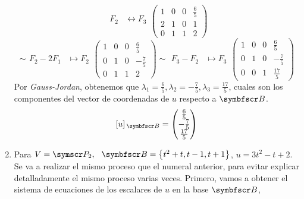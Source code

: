 \begin{enumerate}[label=\listAlph]
\[\begin{aligned}
                    F_2 &\leftrightarrow F_3 \\
                \end{aligned}
                \left(
                \begin{array}{ccc|c}
                    1 & 0 & 0 & \frac{6}{5} \\
                    2 & 1 & 0 & 1 \\
                    0 & 1 & 1 & 2
                \end{array}
                \right)
            \]
            \[
                \sim
                \begin{aligned}
                    F_2 - 2F_1 &\mapsto F_2
                \end{aligned}
                \left(
                \begin{array}{ccc|c}
                    1 & 0 & 0 & \frac{6}{5} \\
                    0 & 1 & 0 & -\frac{7}{5} \\
                    0 & 1 & 1 & 2
                \end{array}
                \right)
                \sim
                \begin{aligned}
                    F_3 - F_2 &\mapsto F_3 
                \end{aligned}
                \left(
                \begin{array}{ccc|c}
                    1 & 0 & 0 & \frac{6}{5} \\
                    0 & 1 & 0 & -\frac{7}{5} \\
                    0 & 0 & 1 & \frac{17}{5}
                \end{array}
                \right)
            \]
            Por \emph{Gauss-Jordan}, obtenemos que \(\lambda_1 = \frac{6}{5}, \lambda_2 = -\frac{7}{5}, \lambda_3 = \frac{17}{5}\), 
            cuales son los componentes del vector de coordenadas de \(u\) respecto a \(\fb\).
            \[
                \veccoord{u}{\fb} = \fvec{\frac{6}{5},-\frac{7}{5},\frac{17}{5}}
            \]
        \item Para \(V = \fp_2, \hspace{0.25cm} \fb = \fset{t^2 + t, t - 1, t + 1}\), \(u = 3t^2 - t + 2\). \\
            Se va a realizar el mismo proceso que el numeral anterior, para evitar explicar detalladamente el mismo proceso varias veces. 
            Primero, vamos a obtener el sistema de ecuaciones de los escalares de \(u\) en la base \(\fb\), 

\end{enumerate}
